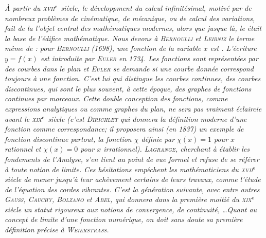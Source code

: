 
\textsl{À partir du \textsc{xvii}$^{\mathrm{e}}$ siècle, le développment du calcul infinitésimal, motivé par de nombreux problèmes de cinématique, de mécanique, ou de calcul des variations, fait de la  l'objet central des mathématiques modernes, alors que jusque là, le  était la base de l'édifice mathématique. Nous devons à \textsc{Bernoulli} et \textsc{Leibniz} le terme même de : pour \textsc{Bernoulli} (1698), une fonction de la variable $x$ est . L'écriture $y = f(x)$ est introduite par \textsc{Euler} en 1734. Les fonctions sont représentées par des courbes dans le plan et \textsc{Euler} se demande si une courbe donnée correspond toujours à une fonction. C'est lui qui distingue les courbes continues, des courbes discontinues, qui sont le plus souvent, à cette époque, des graphes de fonctions continues par morceaux. Cette double conception des fonctions, comme expressions analytiques ou comme graphes du plan, ne sera pas vraiment éclaircie avant le \textsc{xix}$^{\mathrm{e}}$ siècle (c'est \textsc{Dirichlet} qui donnera la définition moderne d'une fonction comme correspondance; il proposera ainsi (en 1837) un exemple de fonction discontinue partout, la fonction $\chi$ définie par $\chi(x) = 1$ pour $x$ rationnel et $\chi(x)=0$ pour $x$ irrationnel). \textsc{Lagrange}, cherchant à établir les fondements de l'Analyse, s'en tient au point de vue formel et refuse de se référer à toute notion de limite. Ces hésitations empêchent les mathématiciens du \textsc{xvii}$^{\mathrm{e}}$ siècle  de mener jusqu'à leur achèvement certains de leurs travaux, comme l'étude de l'équation des cordes vibrantes. C'est la génération suivante, avec entre autres \textsc{Gauss}, \textsc{Cauchy}, \textsc{Bolzano} et \textsc{Abel}, qui donnera dans la première moitié du \textsc{xix}$^{\mathrm{e}}$ siècle un statut rigoureux aux notions de convergence, de continuité, \dots Quant au concept de limite d'une fonction numérique, on doit sans doute sa première définition précise à \textsc{Weierstrass}. 
}
